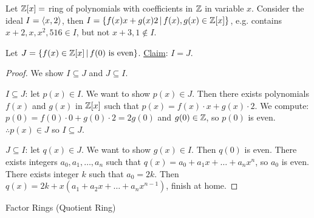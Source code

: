 \documentclass[]{article}
\begin{document}
\begin{example}
	Let $\mathbb{Z}[x] = $ ring of polynomials with coefficients in $\mathbb{Z}$ in variable $x$.
	Consider the ideal $I=\left\langle x,2 \right\rangle$, then $I=\left\{ f(x)x+g(x)2 \, \middle| \, f(x),g(x)\in\mathbb{Z}[x] \right\}$, e.g. contains $x+2,x,x^2,516\in I$, but not $x+3,1\notin I$.

	Let $J = \left\{ f(x)\in\mathbb{Z}[x] \, \middle| \, f(0)\text{ is even} \right\}$.
	\ul{Claim}: $I=J$.
\end{example}
\begin{proof}
	We show $I\subseteq J$ and $J\subseteq I$.

	\ul{$I\subseteq J$}: let $p(x)\in I$. We want to show $p(x)\in J$.
	Then there exists polynomials $f(x)$ and $g(x)$ in $\mathbb{Z}[x]$ such that $p(x)=f(x)\cdot x+g(x)\cdot2$.
	We compute: $p(0)=f(0)\cdot0+g(0)\cdot2 = 2g(0)$ and $g(0)\in\mathbb{Z}$, so $p(0)$ is even.
	$\therefore p(x)\in J$ so $I\subseteq J$.

	\ul{$J\subseteq I$}: let $q(x)\in J$. We want to show $g(x)\in I$.
	Then $q(0)$ is even. There exists integers $a_0,a_1,\dots,a_n$ such that $q(x)=a_0+a_1x+\dots+a_nx^n$, so $a_0$ is even.
	There exists integer $k$ such that $a_0=2k$.
	Then $q(x) = 2k+x(a_1+a_2x+\dots+a_nx^{n-1})$, finish at home.
\end{proof} 

Factor Rings (Quotient Ring)
\end{document}

